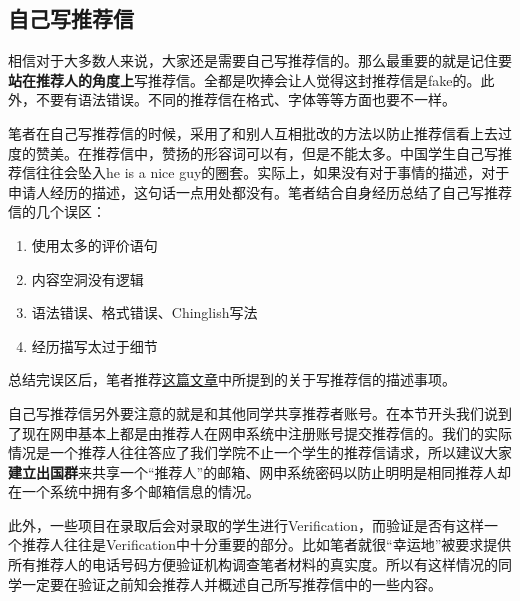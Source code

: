 \subsection{自己写推荐信}
相信对于大多数人来说，大家还是需要自己写推荐信的。那么最重要的就是记住要\textbf{站在推荐人的角度上}写推荐信。全都是吹捧会让人觉得这封推荐信是fake的。此外，不要有语法错误。不同的推荐信在格式、字体等等方面也要不一样。\par
笔者在自己写推荐信的时候，采用了和别人互相批改的方法以防止推荐信看上去过度的赞美。在推荐信中，赞扬的形容词可以有，但是不能太多。中国学生自己写推荐信往往会坠入he is a nice guy的圈套。实际上，如果没有对于事情的描述，对于申请人经历的描述，这句话一点用处都没有。笔者结合自身经历总结了自己写推荐信的几个误区：
\begin{enumerate}
\item 使用太多的评价语句
\item 内容空洞没有逻辑
\item 语法错误、格式错误、Chinglish写法
\item 经历描写太过于细节
\end{enumerate}\par
总结完误区后，笔者推荐\href{https://www.e-education.psu.edu/writingrecommendationlettersonline/node/112}{这篇文章}中所提到的关于写推荐信的描述事项。\par
自己写推荐信另外要注意的就是和其他同学共享推荐者账号。在本节开头我们说到了现在网申基本上都是由推荐人在网申系统中注册账号提交推荐信的。我们的实际情况是一个推荐人往往答应了我们学院不止一个学生的推荐信请求，所以建议大家\textbf{建立出国群}来共享一个“推荐人”的邮箱、网申系统密码以防止明明是相同推荐人却在一个系统中拥有多个邮箱信息的情况。\par
此外，一些项目在录取后会对录取的学生进行Verification，而验证是否有这样一个推荐人往往是Verification中十分重要的部分。比如笔者就很“幸运地”被要求提供所有推荐人的电话号码方便验证机构调查笔者材料的真实度。所以有这样情况的同学一定要在验证之前知会推荐人并概述自己所写推荐信中的一些内容。\par